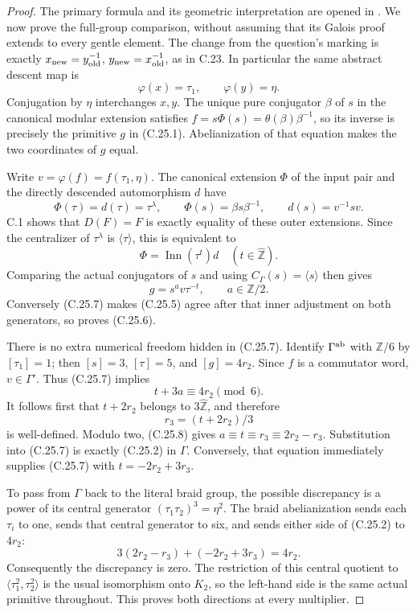 \begin{proof}
The primary formula and its geometric interpretation
are opened in \cite[Theorem 2, (GF$_0$), and
\S4]{PBC_NT2002}. We now prove the full-group
comparison, without assuming that its Galois
proof extends to every gentle element.
The change from the question's marking is exactly
$x_{\rm new}=y_{\rm old}^{-1}$,
$y_{\rm new}=x_{\rm old}^{-1}$, as in C.23.
In particular the same abstract descent map is
\[
              \varphi(x)=\tau_1,\qquad
              \varphi(y)=\eta.
 \tag{C.25.4}
\]
Conjugation by $\eta$ interchanges $x,y$.
The unique pure conjugator $\beta$ of $s$ in
the canonical modular extension satisfies
$f=s\Phi(s)=\theta(\beta)\beta^{-1}$,
so its inverse is precisely the primitive $g$
in (C.25.1). Abelianization of that equation
makes the two coordinates of $g$ equal.

Write $v=\varphi(f)=f(\tau_1,\eta)$.
The canonical extension $\Phi$ of the input
pair and the directly descended automorphism
$d$ have
\[
 \Phi(\tau)=d(\tau)=\tau^\lambda,\qquad
 \Phi(s)=\beta s\beta^{-1},\qquad
                  d(s)=v^{-1}sv.
 \tag{C.25.5}
\]
C.1 shows that $D(F)=F$ is exactly equality
of these outer extensions. Since the centralizer
of $\tau^\lambda$ is $\langle\tau\rangle$,
this is equivalent to
\[
                 \Phi=\operatorname{Inn}(\tau^t)d
                       \quad(t\in\widehat{\mathbb Z}).
 \tag{C.25.6}
\]
Comparing the actual conjugators of $s$ and
using $C_\Gamma(s)=\langle s\rangle$ then gives
\[
               g=s^a v\tau^{-t},\qquad a\in\mathbb Z/2.
 \tag{C.25.7}
\]
Conversely (C.25.7) makes (C.25.5) agree after
that inner adjustment on both generators,
so proves (C.25.6).

There is no extra numerical freedom hidden in
(C.25.7). Identify $\Gamma^{\rm ab}$ with
$\mathbb Z/6$ by $[\tau_1]=1$; then
$[s]=3$, $[\tau]=5$, and
$[g]=4r_2$. Since $f$ is a commutator word,
$v\in\Gamma'$. Thus (C.25.7) implies
\[
                  t+3a\equiv4r_2\pmod6.
 \tag{C.25.8}
\]
It follows first that $t+2r_2$ belongs to
$3\widehat{\mathbb Z}$, and therefore
\[
                r_3=(t+2r_2)/3
 \tag{C.25.9}
\]
is well-defined. Modulo two, (C.25.8) gives
$a\equiv t\equiv r_3\equiv2r_2-r_3$.
Substitution into (C.25.7) is exactly
(C.25.2) in $\Gamma$. Conversely, that equation
immediately supplies (C.25.7) with
$t=-2r_2+3r_3$.

To pass from $\Gamma$ back to the literal
braid group, the possible discrepancy is a
power of its central generator
$(\tau_1\tau_2)^3=\eta^2$.
The braid abelianization sends each $\tau_i$
to one, sends that central generator to six,
and sends either side of (C.25.2) to $4r_2$:
\[
             3(2r_2-r_3)+(-2r_2+3r_3)=4r_2.
\]
Consequently the discrepancy is zero. The
restriction of this central quotient to
$\langle\tau_1^2,\tau_2^2\rangle$ is the
usual isomorphism onto $K_2$, so the left-hand
side is the same actual primitive throughout.
This proves both directions at every multiplier.


\end{proof}
